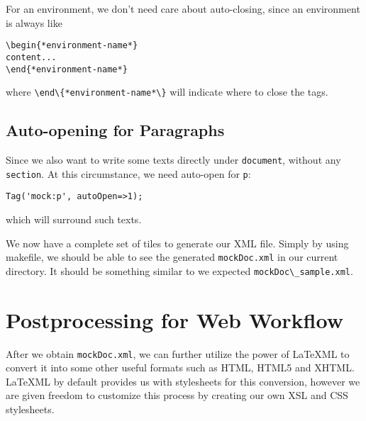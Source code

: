 \documentclass[a4paper]{article}
\def\latexml{{\LaTeX}ML\xspace}
\begin{document}
 For an environment, we don't need care about auto-closing, since an environment is always like
\begin{lstlisting}
\begin{*environment-name*}
content...
\end{*environment-name*}
\end{lstlisting}
where \lstinline|\end\{*environment-name*\}| will indicate where to close the tags.

\subsection{Auto-opening for Paragraphs}
Since we also want to write some texts directly under \lstinline|document|, without any \lstinline|section|. At this circumstance, we need auto-open for \lstinline|p|:
\begin{lstlisting}
Tag('mock:p', autoOpen=>1);
\end{lstlisting}
which will surround such texts.


We now have a complete set of tiles to generate our XML file. Simply by using makefile, we should be able to see the generated \lstinline|mockDoc.xml| in our current directory. It should be something similar to we expected
\lstinline|mockDoc\_sample.xml|.

\section{Postprocessing for Web Workflow}
After we obtain \lstinline|mockDoc.xml|, we can further utilize the power of \latexml to convert it into some other
useful formats such as HTML, HTML5 and XHTML. \latexml by default provides us with stylesheets for this conversion, however we are given freedom to customize this process by creating our own XSL and CSS stylesheets.
\end{document}
